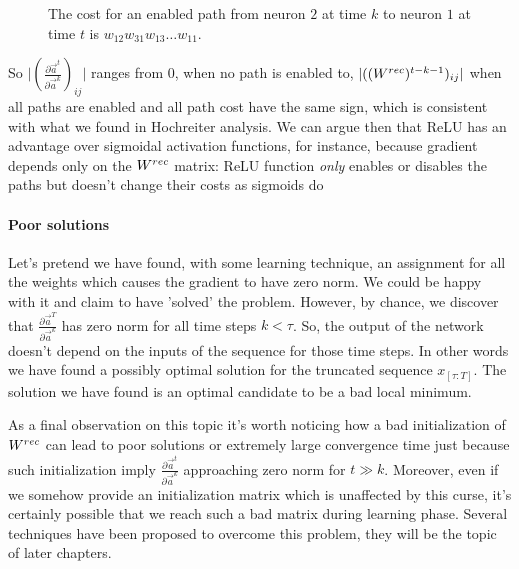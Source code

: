 \begin{figure}
\caption{The cost for an enabled path from neuron $2$ at time $k$ to neuron $1$ at time $t$ is $w_{12}w_{31}w_{13}\hdots w_{11}$. }
\label{gradient_path_cost_relu}
\end{figure}

So $\vert (\frac{\partial \vec{a}^t}{\partial \vec{a}^k})_{ij}\vert$ ranges from 0, when no path is enabled to, $\vert ((W^{rec})^{t-k-1})_{ij} \vert$ when all
paths are enabled and all path cost have the same sign, which is consistent with what we found in Hochreiter analysis.
We can argue then that ReLU has an advantage over sigmoidal activation functions, for instance, because gradient depends only on the $W^{rec}$ matrix:
ReLU function \textit{only} enables or disables the paths but doesn't change their costs as sigmoids do


\paragraph{Poor solutions}
Let's pretend we have found, with some learning technique, an assignment for all the weights which causes the gradient to have zero norm. We could be happy with
it and claim to have 'solved' the problem. However, by chance, we discover that $\frac{\partial \vec{a}^T}{\partial \vec{a}^k}$ has zero norm for all
time steps $k<\tau$. So, the output of the network doesn't depend on the inputs of the sequence for those time steps.
In other words we have found a possibly optimal solution for the truncated sequence ${x}_{[\tau:T]}$. The solution we have found is an optimal candidate to
be a bad local minimum.

As a final observation on this topic it's worth noticing how a bad initialization of $W^{rec}$ can lead to poor solutions or extremely large convergence time
just because such initialization imply $\frac{\partial \vec{a}^t}{\partial \vec{a}^k}$ approaching zero norm for $t\gg k$. Moreover, even if we somehow provide
an initialization matrix which is unaffected by this curse, it's certainly possible that we reach such a bad matrix during learning phase.
Several techniques have been proposed to overcome this problem, they will be the topic of later chapters.





